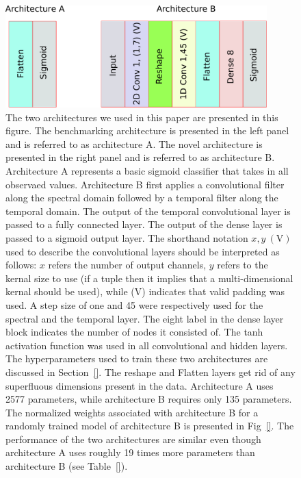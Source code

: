 \documentclass{article}
\begin{document}

\begin{figure}
\includegraphics[width=0.9\textwidth]{Architectures.pdf} 
\caption{The two architectures we used in this paper are presented in this figure. The benchmarking architecture is presented in the left panel and is referred to as architecture A. The novel architecture is presented in the right panel and is referred to as architecture B. Architecture A represents a basic sigmoid classifier that takes in all observaed values. Architecture B first applies a convolutional filter along the spectral domain followed by a temporal filter along the temporal domain. The output of the temporal convolutional layer is passed to a fully connected layer. The output of the dense layer is passed to a sigmoid output layer. The shorthand notation $x, y~(\textrm{V})$ used to describe the convolutional layers should be interpreted as follows: $x$ refers the number of output channels, $y$ refers to the kernal size to use (if a tuple then it implies that a multi-dimensional kernal should be used), while (V) indicates that valid padding was used. A step size of one and 45 were respectively used for the spectral and the temporal layer. The eight label in the dense layer block indicates the number of nodes it consisted of. The tanh activation function was used in all convolutional and hidden layers. The hyperparameters used to train these two architectures are discussed in Section~\ref{}. The reshape and Flatten layers get rid of any superfluous dimensions present in the data. Architecture A uses 2577 parameters, while architecture B requires only 135 parameters. The normalized weights associated with architecture B for a randomly trained model of architecture B is presented in Fig~\ref{}. The performance of the two architectures are similar even though architecture A uses roughly 19 times more parameters than architecture B (see Table~\ref{}).}
\label{fig:ach}

\end{figure}
\end{document}
